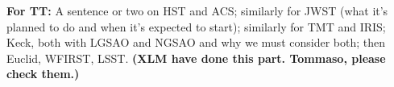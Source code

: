 \documentclass[a4paper,11pt]{article}
\begin{document}
\textbf{For TT:} A sentence or two on HST and ACS; similarly for JWST (what it's planned to do and when it's expected to start); similarly for TMT and IRIS; Keck, both with LGSAO and NGSAO and why we must consider both; then Euclid, WFIRST, LSST. \textbf{(XLM have done this part. Tommaso, please check them.)}



\end{document}

